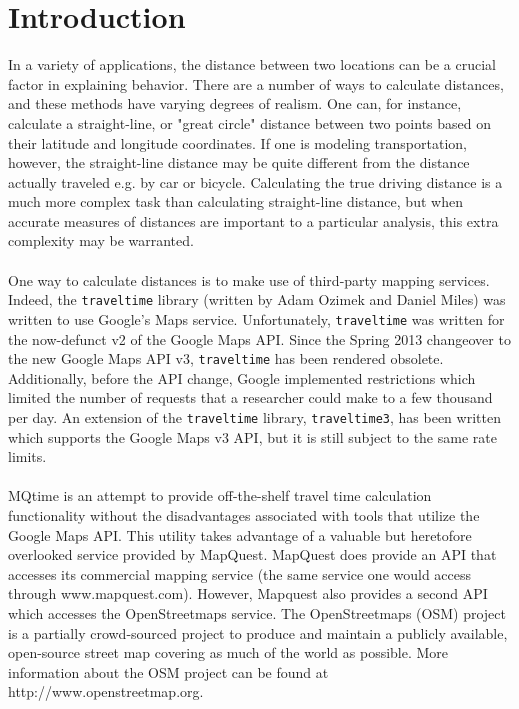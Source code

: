\documentclass[12pt]{article}
\begin{document}
\section{Introduction}
In a variety of applications, the distance between two locations can be a crucial factor in explaining behavior. There are a number of ways to calculate distances, and these methods have varying degrees of realism. One can, for instance, calculate a straight-line, or "great circle" distance between two points based on their latitude and longitude coordinates. If one is modeling transportation, however, the straight-line distance may be quite different from the distance actually traveled e.g. by car or bicycle. Calculating the true driving distance is a much more complex task than calculating straight-line distance, but when accurate measures of distances are important to a particular analysis, this extra complexity may be warranted.
\\ \\
One way to calculate distances is to make use of third-party mapping services. Indeed, the \verb|traveltime| library (written by Adam Ozimek and Daniel Miles) was written to use Google's Maps service. Unfortunately, \verb|traveltime| was written for the now-defunct v2 of the Google Maps API. Since the Spring 2013 changeover to the new Google Maps API v3, \verb|traveltime| has been rendered obsolete. Additionally, before the API change, Google implemented restrictions which limited the number of requests that a researcher could make to a few thousand per day. An extension of the \verb|traveltime| library, \verb|traveltime3|, has been written which supports the Google Maps v3 API, but it is still subject to the same rate limits. 
\\ \\
MQtime is an attempt to provide off-the-shelf travel time calculation functionality without the disadvantages associated with tools that utilize the Google Maps API. This utility takes advantage of a valuable but heretofore overlooked service provided by MapQuest. MapQuest does provide an API that accesses its commercial mapping service (the same service one would access through www.mapquest.com). However, Mapquest also provides a second API which accesses the OpenStreetmaps service. The OpenStreetmaps (OSM) project is a partially crowd-sourced project to produce and maintain a publicly available, open-source street map covering as much of the world as possible. More information about the OSM project can be found at http://www.openstreetmap.org. 
\\ \\
\end{document}
